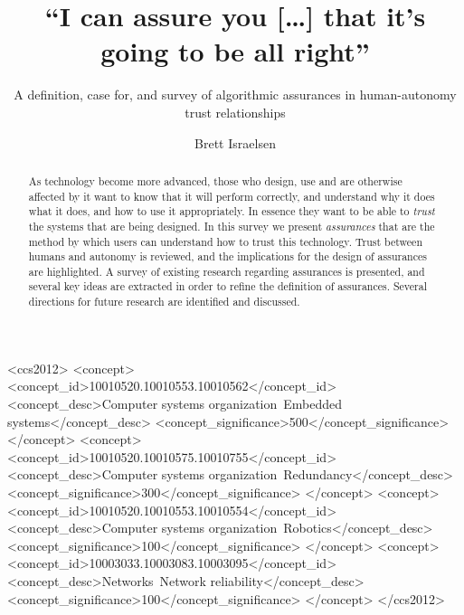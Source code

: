 \documentclass[manuscript, review, screen]{acmart}
\begin{document}
\title{``I can assure you [\ldots] that it's going to be all right''} 
 \subtitle{A definition, case for, and survey of algorithmic assurances in human-autonomy trust relationships}
\author{Brett Israelsen}

\begin{abstract}
    As technology become more advanced, those who design, use and are otherwise affected by it want to know that it will perform correctly, and understand why it does what it does, and how to use it appropriately. In essence they want to be able to \emph{trust} the systems that are being designed. In this survey we present \emph{assurances} that are the method by which users can understand how to trust this technology. Trust between humans and autonomy is reviewed, and the implications for the design of assurances are highlighted. A survey of existing research regarding assurances is presented, and several key ideas are extracted in order to refine the definition of assurances. Several directions for future research are identified and discussed.
\end{abstract}


%
%
\begin{CCSXML}
<ccs2012>
 <concept>
  <concept_id>10010520.10010553.10010562</concept_id>
  <concept_desc>Computer systems organization~Embedded systems</concept_desc>
  <concept_significance>500</concept_significance>
 </concept>
 <concept>
  <concept_id>10010520.10010575.10010755</concept_id>
  <concept_desc>Computer systems organization~Redundancy</concept_desc>
  <concept_significance>300</concept_significance>
 </concept>
 <concept>
  <concept_id>10010520.10010553.10010554</concept_id>
  <concept_desc>Computer systems organization~Robotics</concept_desc>
  <concept_significance>100</concept_significance>
 </concept>
 <concept>
  <concept_id>10003033.10003083.10003095</concept_id>
  <concept_desc>Networks~Network reliability</concept_desc>
  <concept_significance>100</concept_significance>
 </concept>
</ccs2012>  
\end{CCSXML}
\end{document}
